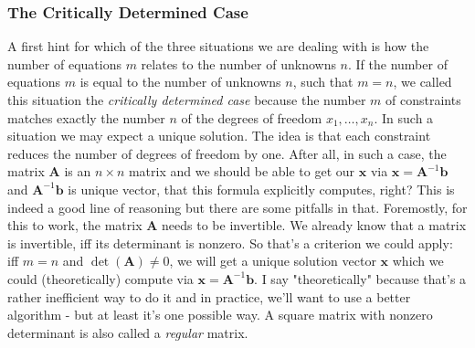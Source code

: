 
\subsubsection{The Critically Determined Case}
A first hint for which of the three situations we are dealing with is how the number of equations $m$ relates to the number of unknowns $n$. If the number of equations $m$ is equal to the number of unknowns $n$, such that $m=n$, we called this situation the \emph{critically determined case} because the number $m$ of constraints matches exactly the number $n$ of the degrees of freedom $x_1, \ldots, x_n$. In such a situation we may expect a unique solution. The idea is that each constraint reduces the number of degrees of freedom by one. After all, in such a case, the matrix $\mathbf{A}$ is an $n \times n$ matrix and we should be able to get our $\mathbf{x}$ via $\mathbf{x} = \mathbf{A}^{-1} \mathbf{b}$ and $\mathbf{A}^{-1} \mathbf{b}$ is unique vector, that this formula explicitly computes, right? This is indeed a good line of reasoning but there are some pitfalls in that. Foremostly, for this to work, the matrix $\mathbf{A}$ needs to be invertible. We already know that a matrix is invertible, iff its determinant is nonzero. So that's a criterion we could apply: iff $m = n$ and $\det(\mathbf{A}) \neq 0$, we will get a unique solution vector $\mathbf{x}$ which we could (theoretically) compute via $\mathbf{x} = \mathbf{A}^{-1} \mathbf{b}$. I say "theoretically" because that's a rather inefficient way to do it and in practice, we'll want to use a better algorithm - but at least it's one possible way. A square matrix with nonzero determinant is also called a \emph{regular} matrix.

